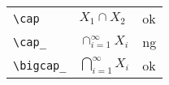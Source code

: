 \documentclass[preview]{standalone}
\newcommand{\tA}[1]{\textcolor{cA}{#1}}
\newcommand{\tD}[1]{\textcolor{cD}{#1}}
\begin{document}
\begin{table}[h]
    \centering
    \begin{tabular}{lll}
        \verb|\cap|     & $X_1 \cap X_2$               & \tA{ok} \\
        \verb|\cap_|    & $\cap_{i=1}^{\infty} X_i$    & \tD{ng} \\
        \verb|\bigcap_| & $\bigcap_{i=1}^{\infty} X_i$ & \tA{ok} \\
    \end{tabular}
\end{table}
\end{document}
